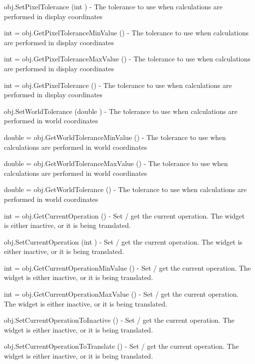\begin{DoxyItemize}
\item {\ttfamily obj.\-Set\-Pixel\-Tolerance (int )} -\/ The tolerance to use when calculations are performed in display coordinates  
\item {\ttfamily int = obj.\-Get\-Pixel\-Tolerance\-Min\-Value ()} -\/ The tolerance to use when calculations are performed in display coordinates  
\item {\ttfamily int = obj.\-Get\-Pixel\-Tolerance\-Max\-Value ()} -\/ The tolerance to use when calculations are performed in display coordinates  
\item {\ttfamily int = obj.\-Get\-Pixel\-Tolerance ()} -\/ The tolerance to use when calculations are performed in display coordinates  
\item {\ttfamily obj.\-Set\-World\-Tolerance (double )} -\/ The tolerance to use when calculations are performed in world coordinates  
\item {\ttfamily double = obj.\-Get\-World\-Tolerance\-Min\-Value ()} -\/ The tolerance to use when calculations are performed in world coordinates  
\item {\ttfamily double = obj.\-Get\-World\-Tolerance\-Max\-Value ()} -\/ The tolerance to use when calculations are performed in world coordinates  
\item {\ttfamily double = obj.\-Get\-World\-Tolerance ()} -\/ The tolerance to use when calculations are performed in world coordinates  
\item {\ttfamily int = obj.\-Get\-Current\-Operation ()} -\/ Set / get the current operation. The widget is either inactive, or it is being translated.  
\item {\ttfamily obj.\-Set\-Current\-Operation (int )} -\/ Set / get the current operation. The widget is either inactive, or it is being translated.  
\item {\ttfamily int = obj.\-Get\-Current\-Operation\-Min\-Value ()} -\/ Set / get the current operation. The widget is either inactive, or it is being translated.  
\item {\ttfamily int = obj.\-Get\-Current\-Operation\-Max\-Value ()} -\/ Set / get the current operation. The widget is either inactive, or it is being translated.  
\item {\ttfamily obj.\-Set\-Current\-Operation\-To\-Inactive ()} -\/ Set / get the current operation. The widget is either inactive, or it is being translated.  
\item {\ttfamily obj.\-Set\-Current\-Operation\-To\-Translate ()} -\/ Set / get the current operation. The widget is either inactive, or it is being translated.  

\end{DoxyItemize}
